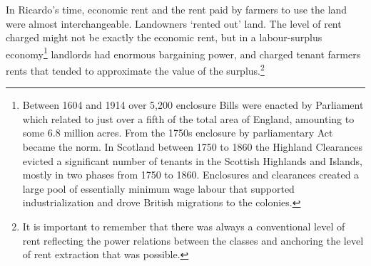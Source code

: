 In Ricardo's time, economic rent and the rent paid by farmers to use the land were almost interchangeable. Landowners `rented out' land. The level of rent charged might not be exactly the economic rent, but in a labour-surplus economy\footnote{Between 1604 and 1914 over 5,200 enclosure Bills were enacted by Parliament which related to just over a fifth of the total area of England, amounting to some 6.8 million acres. From the 1750s enclosure by parliamentary Act became the norm. In Scotland  between 1750 to 1860 the  Highland Clearances  evicted a significant number of tenants in the Scottish Highlands and Islands, mostly in two phases from 1750 to 1860. Enclosures and clearances created a large pool of essentially minimum wage labour that supported industrialization and drove British migrations to the colonies.} landlords had enormous bargaining power, and charged tenant farmers rents that tended to approximate the value of the \gls{surplus}.\footnote{It is important to remember that there was always a conventional level of rent reflecting the power relations between the classes and anchoring the level of rent extraction that was possible.} 


